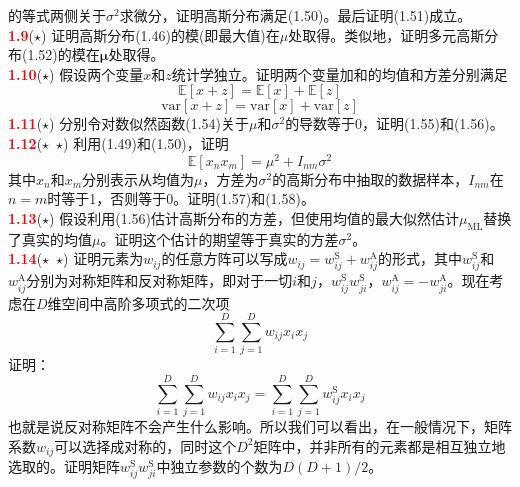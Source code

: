 \documentclass{book}
\numberwithin{equation}{chapter}
\begin{document}
{	的等式两侧关于$\sigma^2$求微分，证明高斯分布满足(1.50)。最后证明(1.51)成立。\\
	\textcolor{red}{\textbf{1.9}}\quad ($\star$) 证明高斯分布(1.46)的模(即最大值)在$\mu$处取得。类似地，证明多元高斯分布(1.52)的模在$\boldsymbol{\mu}$处取得。\\
	\textcolor{red}{\textbf{1.10}}\quad ($\star$) 假设两个变量$x$和$z$统计学独立。证明两个变量加和的均值和方差分别满足
	\begin{equation}
		\mathbb{E}[x+z] = \mathbb{E}[x] + \mathbb{E}[z]
	\end{equation}
	\begin{equation}
		\mathrm{var}[x+z] = \mathrm{var}[x] + \mathrm{var}[z]
	\end{equation}
	\textcolor{red}{\textbf{1.11}}\quad ($\star$) 分别令对数似然函数(1.54)关于$\mu$和$\sigma^2$的导数等于0，证明(1.55)和(1.56)。\\
	\textcolor{red}{\textbf{1.12}}\quad ($\star$\ $\star$) 利用(1.49)和(1.50)，证明
	\begin{equation}
		\mathbb{E}[x_n x_m] = \mu^2 + I_{nm}\sigma^2
	\end{equation}
	其中$x_n$和$x_m$分别表示从均值为$\mu$，方差为$\sigma^2$的高斯分布中抽取的数据样本，$I_{nm}$在$n=m$时等于1，否则等于0。证明(1.57)和(1.58)。\\
	\textcolor{red}{\textbf{1.13}}\quad ($\star$) 假设利用(1.56)估计高斯分布的方差，但使用均值的最大似然估计$\mu_{\mathrm{ML}}$替换了真实的均值$\mu$。证明这个估计的期望等于真实的方差$\sigma^2$。\\
	\textcolor{red}{\textbf{1.14}}\quad ($\star$\ $\star$) 证明元素为$w_{ij}$的任意方阵可以写成$w_{ij}=w_{ij}^\mathrm{S}+w_{ij}^\mathrm{A}$的形式，其中$w_{ij}^\mathrm{S}$和$w_{ij}^\mathrm{A}$分别为对称矩阵和反对称矩阵，即对于一切$i$和$j$，$w_{ij}^\mathrm{S}w_{ji}^\mathrm{S}$，$w_{ij}^\mathrm{A}=-w_{ji}^\mathrm{A}$。现在考虑在$D$维空间中高阶多项式的二次项
	\begin{equation}
		\sum_{i=1}^D \sum_{j=1}^D w_{ij}x_i x_j
	\end{equation}
	证明：
	\begin{equation}
		\sum_{i=1}^D \sum_{j=1}^D w_{ij}x_i x_j = \sum_{i=1}^D \sum_{j=1}^D w_{ij}^{\mathrm{S}}x_i x_j
	\end{equation}
	也就是说反对称矩阵不会产生什么影响。所以我们可以看出，在一般情况下，矩阵系数$w_{ij}$可以选择成对称的，同时这个$D^2$矩阵中，并非所有的元素都是相互独立地选取的。证明矩阵$w_{ij}^\mathrm{S}w_{ji}^\mathrm{S}$中独立参数的个数为$D(D+1)/2$。\\
}
\end{document}

